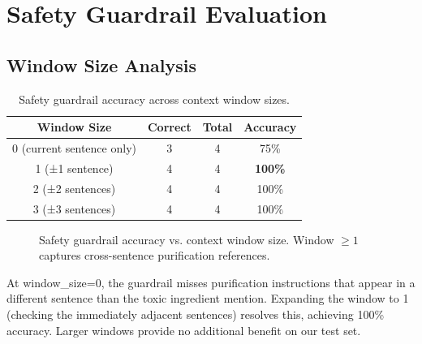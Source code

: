 \documentclass[12pt, a4paper, twoside]{report}
\begin{document}
\section{Safety Guardrail Evaluation}
\label{sec:safety-results}

\subsection{Window Size Analysis}

\begin{table}[htbp]
\centering
\caption{Safety guardrail accuracy across context window sizes.}
\label{tab:safety-window}
\begin{tabular}{cccc}
\toprule
\textbf{Window Size} & \textbf{Correct} & \textbf{Total} & \textbf{Accuracy} \\
\midrule
0 (current sentence only) & 3 & 4 & 75\% \\
1 (±1 sentence) & 4 & 4 & \textbf{100\%} \\
2 (±2 sentences) & 4 & 4 & 100\% \\
3 (±3 sentences) & 4 & 4 & 100\% \\
\bottomrule
\end{tabular}
\end{table}

\begin{figure}[htbp]
\centering
{}
\caption{Safety guardrail accuracy vs. context window size. Window $\geq 1$ captures cross-sentence purification references.}
\label{fig:safety-window}
\end{figure}

At window\_size=0, the guardrail misses purification instructions that appear in a different sentence than the toxic ingredient mention. Expanding the window to 1 (checking the immediately adjacent sentences) resolves this, achieving 100\% accuracy. Larger windows provide no additional benefit on our test set.
\end{document}

